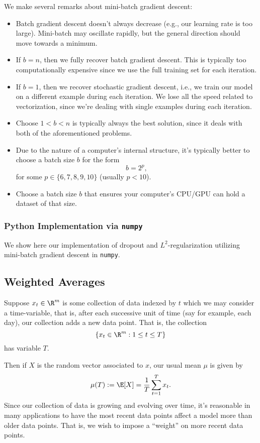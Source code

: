 We make several remarks about mini-batch gradient descent:
\begin{itemize}
	\item Batch gradient descent doesn't always decrease (e.g., our learning rate is too large).  Mini-batch may oscillate rapidly, but the general direction should move towards a minimum.
	\item If $b=n$, then we fully recover batch gradient descent.  This is typically too computationally expensive since we use the full training set for each iteration.
	\item If $b=1$, then we recover stochastic gradient descent, i.e., we train our model on a different example during each iteration.  We lose all the speed related to vectorization, since we're dealing with single examples during each iteration.
	\item Choose $1<b<n$ is typically always the best solution, since it deals with both of the aforementioned problems.
	\item Due to the nature of a computer's internal structure, it's typically better to choose a batch size $b$ for the form
		$$b=2^p,$$
		for some $p\in\{6,7,8,9,10\}$ (usually $p<10$).
	\item Choose a batch size $b$ that ensures your computer's CPU/GPU can hold a dataset of that size.
\end{itemize}



\subsubsection{Python Implementation via \texttt{numpy}}
We show here our implementation of dropout and $L^2$-regularization utilizing mini-batch gradient descent in \texttt{numpy}.




\subsection{Weighted Averages}

Suppose $x_t\in\R^m$ is some collection of data indexed by $t$ which we may consider a time-variable, that is, after each successive unit of time (say for example, each day), our collection adds a new data point.  That is, the collection
$$\{x_t\in\R^m:1\leq t\leq T\}$$
has variable $T$.  

Then if $X$ is the random vector associated to $x$, our usual mean $\mu$ is given by
$$\mu(T):=\E[X]=\frac{1}{T}\sum_{t=1}^Tx_t.$$
Since our collection of data is growing and evolving over time, it's reasonable in many applications to have the most recent data points affect a model more than older data points.  That is, we wish to impose a ``weight'' on more recent data points.

